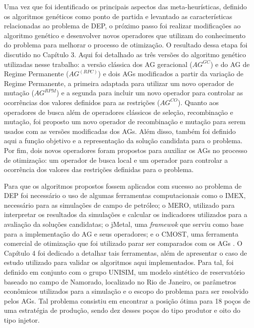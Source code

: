 Uma vez que foi identificado os principais aspectos das meta-heurísticas, definido os algoritmos genéticos como ponto de partida e levantado as características relacionadas ao problema de DEP, o próximo passo foi realizar modificações ao algoritmo genético e desenvolver novos operadores que utilizam do conhecimento do problema para melhorar o processo de otimização. O resultado dessa etapa foi discutido no Capítulo 3. Aqui foi detalhado as três versões do algoritmo genético utilizadas nesse trabalho: a versão clássica dos AG geracional ($AG^{GC}$) e do AG de Regime Permanente ($AG^(RPC)$) e dois AGs modificados a partir da variação de Regime Permanente, a primeira adaptada para utilizar um novo operador de mutação ($AG^{RPM}$) e a segunda para incluir um novo operador para controlar as ocorrências dos valores definidos para as restrições ($AG^{CO}$). Quanto aos operadores de busca além de operadores clássicos de seleção, recombinação e mutação, foi proposto um novo operador de recombinação e mutação para serem usados com as versões modificadas dos AGs. Além disso, também foi definido aqui a função objetivo e a representação da solução candidata para o problema. Por fim, dois novos operadores foram propostos para auxiliar os AGs no processo de otimização: um operador de busca local e um operador para controlar a ocorrência dos valores das restrições definidas para o problema.

Para que os algoritmos propostos fossem aplicados com sucesso ao problema de DEP foi necessário o uso de algumas ferramentas computacionais como o IMEX, necessário para as simulações de campo de petróleo; o MERO, utilizado para interpretar os resultados da simulações e calcular os indicadores utilizados para a avaliação da soluções candidatas; o jMetal, uma \textit{framewok} que serviu como base para a implementação do AG e seus operadores; e o CMOST, uma ferramenta comercial de otimização que foi utilizado parar ser comparados com os AGs . O Capítulo 4 foi dedicado a detalhar tais ferramentas, além de apresentar o caso de estudo utilizado para validar os algoritmos aqui implementados. Para tal, foi definido em conjunto com o grupo UNISIM, um modelo sintético de reservatório baseado no campo de Namorado, localizado no Rio de Janeiro, os parâmetros econômicos utilizados para a simulação e o escopo do problema para ser resolvido pelos AGs. Tal problema consistiu em encontrar a posição ótima para 18 poços de uma estratégia de produção, sendo dez desses poços do tipo produtor e oito do tipo injetor.

